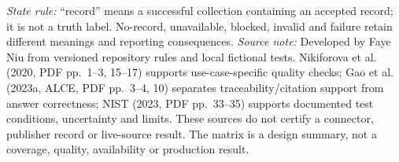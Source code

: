 \begin{table}[p]
  \caption{Fixed source connectors and their current states}
  \label{tab:sys-adapter-capability-state}

  \vspace{4pt}
  \parbox{\textwidth}{\scriptsize
    \textit{State rule:} ``record'' means a successful collection containing an accepted
    record; it is not a truth label. No-record, unavailable, blocked, invalid and failure retain
    different meanings and reporting consequences. \textit{Source note:} Developed by Faye Niu
    from versioned repository rules and local fictional tests. Nikiforova et al.
    (2020, PDF pp.~1--3, 15--17) supports use-case-specific quality checks; Gao et al. (2023a,
    ALCE, PDF pp.~3--4, 10) separates traceability/citation support from answer correctness; NIST
    (2023, PDF pp.~33--35) supports documented test conditions, uncertainty and limits. These
    sources do not certify a connector, publisher record or live-source result. The matrix is a
    design summary, not a coverage, quality, availability or production result.}
\end{table}
\clearpage
